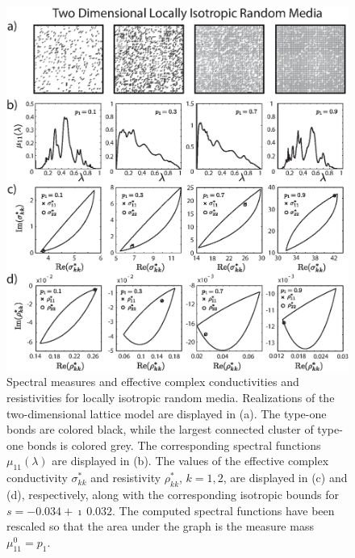 \documentclass{cmslatex}
\begin{document}
%
\begin{figure}[t]
  \centerline{\includegraphics[scale=0.73]{A_Locally_Isotropic_RRN_11.eps}}
\caption{Spectral measures and effective complex conductivities and
  resistivities for locally isotropic random media. Realizations of
  the two-dimensional lattice model are displayed in (a). The type-one
  bonds are colored black, while the largest connected cluster of
  type-one bonds is colored grey. The corresponding spectral functions
  $\mu_{11}(\lambda)$ are displayed in (b). The values of the effective complex
  conductivity $\sigma^*_{kk}$ and resistivity $\rho^*_{kk}$, $k=1,2$, are
  displayed in (c) and (d), respectively, along with the corresponding
  isotropic bounds for   $s=-0.034+\imath\,0.032$. The computed spectral
  functions have been rescaled so that the area under the graph is the
  measure mass $\mu^0_{11}=p_1$.    
        } 
\label{fig:LocIsotropic_RRN_11}
\end{figure}
%


   
\end{document}
